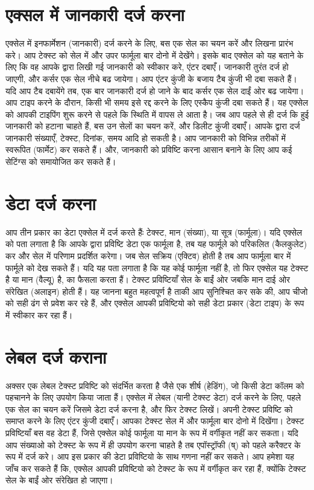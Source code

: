 \section{एक्सल में जानकारी दर्ज करना}\label{id-1.28}

एक्सेल में इनफार्मेशन (जानकारी) दर्ज करने के लिए, बस एक सेल का चयन करें और लिखना प्रारंभ करे। आप टेक्स्ट को सेल में और उपर फार्मूला बार दोनो में देखेंगे। इसके बाद एक्सेल को यह बताने के लिए कि वह आपके द्वारा लिखी गई जानकारी को स्वीकार करे, एंटर दबाएँ। जानकारी तुरंत दर्ज हो जाएगी, और कर्सर एक सेल नीचे बढ जायेगा। आप एंटर कुंजी के बजाय टैब कुंजी भी दबा सकते हैं। यदि आप टैब दबायेंगे तब, एक बार जानकारी दर्ज हो जाने के बाद कर्सर एक सेल दाईं ओर बढ जायेगा। आप टाइप करने के दौरान, किसी भी समय इसे रद्द करने के लिए एस्कैप कुंजी दबा सकते हैं। यह एक्सेल को आपकी टाइपिंग शुरू करने से पहले कि स्थिति में वापस ले आता है। जब आप पहले से ही दर्ज कि हुई जानकारी को हटाना चाहते हैं, बस उन सेलों का चयन करें, और डिलीट कुंजी दबाएँ। आपके द्वारा दर्ज जानकारी संख्याएँ, टेक्स्ट, दिनांक, समय आदि हो सकती है। आप जानकारी को विभिन्न तरीकों में स्वरूपित (फार्मेट) कर सकते हैं। और, जानकारी को प्रविष्टि करना आसान बनाने के लिए आप कई सेटिंग्स को समायोजित कर सकते हैं।

\section{डेटा दर्ज करना}\label{id-1.29}	

आप तीन प्रकार का डेटा एक्सेल में दर्ज करते हैंः टेक्स्ट, मान (संख्या), या सूत्र (फार्मूला)। यदि एक्सेल को पता लगाता है कि आपके द्वारा प्रविष्टि डेटा एक फार्मूला है, तब यह फार्मूले को परिकलित (कैलकुलेट) कर और सेल में परिणाम प्रदर्शित करेगा। जब सेल सक्रिय (एक्टिव) होती है तब आप फार्मूला बार में फार्मूले को देख सकते हैं। यदि यह पता लगाता है कि यह कोई फार्मूला नहीं है, तो फिर एक्सेल यह टेक्स्ट है या मान (वैल्यू) है, का फैसला करता हैं। टेक्स्ट प्रविष्टियाँ सेल के बाईं ओर जबकि मान दाई ओर संरेखित (अलाइन) होती हैं। यह जानना बहुत महत्वपूर्ण है ताकी आप सुनिश्चित कर सके की, आप चीजो को सही ढंग से प्रवेश कर रहे हैं, और एक्सेल आपकी प्रविष्टियो को सही डेटा प्रकार (डेटा टाइप) के रूप में स्वीकार कर रहा हैं।

\section{लेबल दर्ज कराना}\label{id-1.30}	

अक्सर एक लेबल टेक्स्ट प्रविष्टि को संदर्भित करता है जैसे एक शीर्ष (हेडिंग), जो किसी डेटा कॉलम को पहचानने के लिए उपयोग किया जाता हैं। एक्सेल में लेबल (यानी टेक्स्ट डेटा) दर्ज करने के लिए, पहले एक सेल का चयन करें जिसमे डेटा दर्ज करना है, और फिर टेक्स्ट लिखें। अपनी टेक्स्ट प्रविष्टि को समाप्त करने के लिए एंटर कुंजी दबाएँ। आपका टेक्स्ट सेल में और फार्मूला बार दोनो में दिखेंगा। टेक्स्ट प्रविष्टियाँ बस वह डेटा हैं, जिसे एक्सेल कोई फार्मूला या मान के रूप में वर्गीकृत नहीं कर सकता। यदि आप संख्याओ को टेक्स्ट के रूप में ही उपयोग करना चाहते है तब एपॉस्ट्रॉफी (ष्) को पहले करैक्टर के रूप में दर्ज करे। आप इस प्रकार की डेटा प्रविष्टियो के साथ गणना नहीं कर सकते। आप हमेशा यह जाँच कर सकते हैं कि, एक्सेल आपकी प्रविष्टियो को टेक्स्ट के रूप में वर्गीकृत कर रहा हैं, क्योंकि टेक्स्ट सेल के बाईं ओर संरेखित हो जाएगा।

